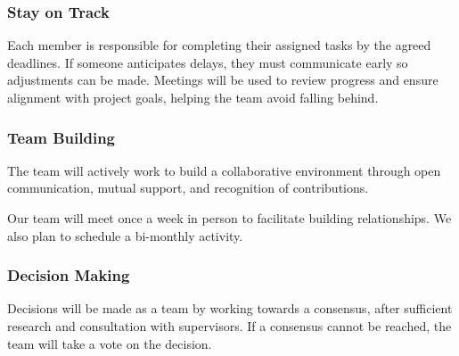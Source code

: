 \documentclass{article}
\begin{document}
\subsubsection*{Stay on Track}
Each member is responsible for completing their assigned tasks by the agreed deadlines. If someone anticipates delays, they must communicate early so adjustments can be made. Meetings will be used to review progress and ensure alignment with project goals, helping the team avoid falling behind.

\begin{comment}
\wss{What methods will be used to keep the team on track? How will your team
ensure that members contribute as expected to the team and that the team
performs as expected? How will your team reward members who do well and manage
members whose performance is below expectations?  What are the consequences for
someone not contributing their fair share?}
\end{comment}


\begin{comment}
\wss{You may wish to use the project management metrics collected for the TA and
instructor for this.}
\end{comment}


\begin{comment}
\wss{You can set target metrics for attendance, commits, etc.  What are the
consequences if someone doesn't hit their targets?  Do they need to bring the
coffee to the next team meeting?  Does the team need to make an appointment with
their TA, or the instructor?  Are there incentives for reaching targets early?}
\end{comment}

\subsubsection*{Team Building}
The team will actively work to build a collaborative environment through open communication, mutual support, and recognition of contributions.

\begin{comment}
\wss{How will you build team cohesion (fun time, group rituals, etc.)? }
\end{comment}
Our team will meet once a week in person to facilitate building relationships. We also plan to schedule a bi-monthly activity. 
\subsubsection*{Decision Making} 

\begin{comment}
\wss{How will you make decisions in your group? Consensus?  Vote? How will you
handle disagreements? }

\end{comment}
Decisions will be made as a team by working towards a consensus, after sufficient research and consultation with supervisors. If a consensus cannot be reached, the team will take a vote on the decision.
\end{document}
